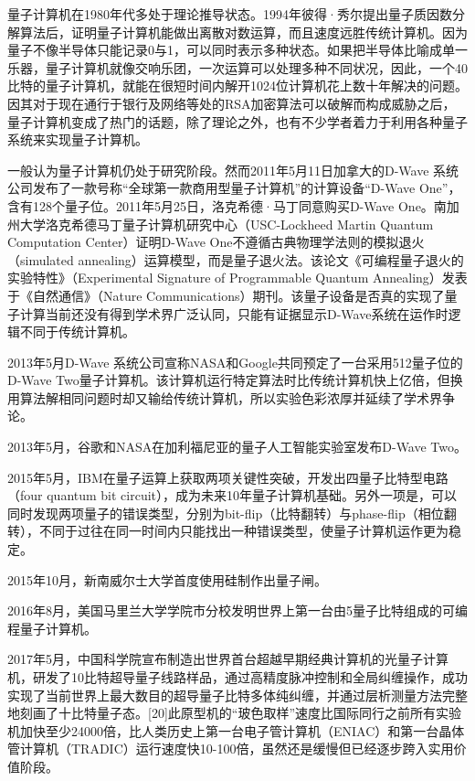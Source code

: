 \documentclass{article}
\begin{document}
量子计算机在1980年代多处于理论推导状态。1994年彼得·秀尔提出量子质因数分解算法后，证明量子计算机能做出离散对数运算，而且速度远胜传统计算机。因为量子不像半导体只能记录0与1，可以同时表示多种状态。如果把半导体比喻成单一乐器，量子计算机就像交响乐团，一次运算可以处理多种不同状况，因此，一个40比特的量子计算机，就能在很短时间内解开1024位计算机花上数十年解决的问题。因其对于现在通行于银行及网络等处的RSA加密算法可以破解而构成威胁之后，量子计算机变成了热门的话题，除了理论之外，也有不少学者着力于利用各种量子系统来实现量子计算机。

一般认为量子计算机仍处于研究阶段。然而2011年5月11日加拿大的D-Wave 系统公司发布了一款号称“全球第一款商用型量子计算机”的计算设备“D-Wave One”，含有128个量子位。2011年5月25日，洛克希德·马丁同意购买D-Wave One。南加州大学洛克希德马丁量子计算机研究中心（USC-Lockheed Martin Quantum Computation Center）证明D-Wave One不遵循古典物理学法则的模拟退火（simulated annealing）运算模型，而是量子退火法。该论文《可编程量子退火的实验特性》（Experimental Signature of Programmable Quantum Annealing）发表于《自然通信》（Nature Communications）期刊。该量子设备是否真的实现了量子计算当前还没有得到学术界广泛认同，只能有证据显示D-Wave系统在运作时逻辑不同于传统计算机。

2013年5月D-Wave 系统公司宣称NASA和Google共同预定了一台采用512量子位的D-Wave Two量子计算机。该计算机运行特定算法时比传统计算机快上亿倍，但换用算法解相同问题时却又输给传统计算机，所以实验色彩浓厚并延续了学术界争论。

2013年5月，谷歌和NASA在加利福尼亚的量子人工智能实验室发布D-Wave Two。

2015年5月，IBM在量子运算上获取两项关键性突破，开发出四量子比特型电路（four quantum bit circuit），成为未来10年量子计算机基础。另外一项是，可以同时发现两项量子的错误类型，分别为bit-flip（比特翻转）与phase-flip（相位翻转），不同于过往在同一时间内只能找出一种错误类型，使量子计算机运作更为稳定。

2015年10月，新南威尔士大学首度使用硅制作出量子闸。

2016年8月，美国马里兰大学学院市分校发明世界上第一台由5量子比特组成的可编程量子计算机。

2017年5月，中国科学院宣布制造出世界首台超越早期经典计算机的光量子计算机，研发了10比特超导量子线路样品，通过高精度脉冲控制和全局纠缠操作，成功实现了当前世界上最大数目的超导量子比特多体纯纠缠，并通过层析测量方法完整地刻画了十比特量子态。[20]此原型机的“玻色取样”速度比国际同行之前所有实验机加快至少24000倍，比人类历史上第一台电子管计算机（ENIAC）和第一台晶体管计算机（TRADIC）运行速度快10-100倍，虽然还是缓慢但已经逐步跨入实用价值阶段。
\end{document}
